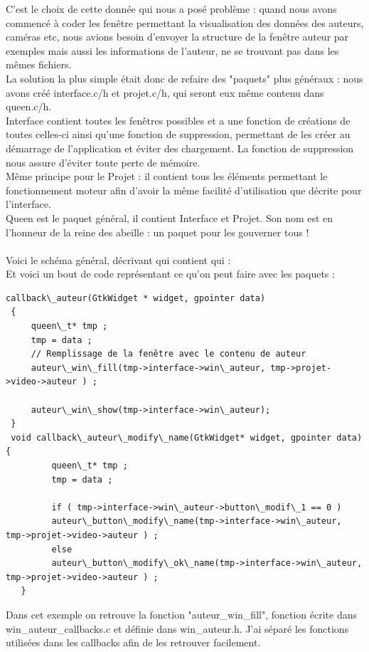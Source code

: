 \documentclass[11pt,french,a4paper]{report}
\begin{document}
C'est le choix de cette donnée qui nous a posé problème : quand nous avons commencé
à coder les fenêtre permettant la visualisation des données des auteurs, caméras etc, nous avions besoin d'envoyer la structure
de la fenêtre auteur par exemples mais aussi les informations de l'auteur, ne se trouvant pas dans les mêmes fichiers.  \\
La solution la plus simple était donc de refaire des "paquets" plus généraux : nous avons créé interface.c/h et projet.c/h, qui seront eux
même contenu dans queen.c/h. \\
Interface contient toutes les fenêtres possibles et a une fonction de créations de toutes celles-ci ainsi qu'une fonction de suppression, 
permettant de les créer au démarrage de l'application et éviter des chargement. La fonction de suppression nous assure d'éviter toute perte de mémoire.\\
Même principe pour le Projet : il contient tous les éléments permettant le fonctionnement moteur afin d'avoir la même facilité
d'utilisation que décrite pour l'interface. \\
Queen est le paquet général, il contient Interface et Projet. Son nom est en l'honneur de la reine des abeille : 
un paquet pour les gouverner tous ! \\
\\
Voici le schéma général, décrivant qui contient qui :%
\\
Et voici un bout de code représentant ce qu'on peut faire avec les paquets : 
\begin{lstlisting}
callback\_auteur(GtkWidget * widget, gpointer data)
 {
     queen\_t* tmp ;
     tmp = data ;
     // Remplissage de la fenêtre avec le contenu de auteur
     auteur\_win\_fill(tmp->interface->win\_auteur, tmp->projet->video->auteur ) ;

     auteur\_win\_show(tmp->interface->win\_auteur);
 }
 void callback\_auteur\_modify\_name(GtkWidget* widget, gpointer data) {
         queen\_t* tmp ;
         tmp = data ;

         if ( tmp->interface->win\_auteur->button\_modif\_1 == 0 )
         auteur\_button\_modify\_name(tmp->interface->win\_auteur, tmp->projet->video->auteur ) ;
         else
         auteur\_button\_modify\_ok\_name(tmp->interface->win\_auteur, tmp->projet->video->auteur ) ;
   }
\end{lstlisting}
Dans cet exemple on retrouve la fonction "auteur\_win\_fill", fonction écrite dans win\_auteur\_callbacks.c et définie
dans win\_auteur.h. J'ai séparé les fonctions utilisées dans les callbacks afin de les retrouver facilement. \\
\end{document}
